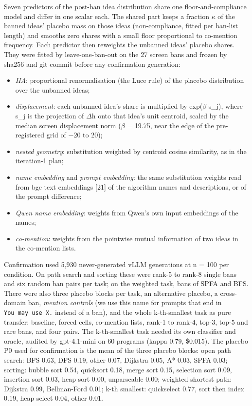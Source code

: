 \documentclass[11pt,letterpaper]{article}
\begin{document}
Seven predictors of the post-ban idea distribution share one floor-and-compliance model and differ in one scalar each. The shared part keeps a fraction \ensuremath{\kappa} of the banned ideas' placebo mass on those ideas (non-compliance, fitted per ban-list length) and smooths zero shares with a small floor proportional to co-mention frequency. Each predictor then reweights the unbanned ideas' placebo shares. They were fitted by leave-one-ban-out on the 27 screen bans and frozen by sha256 and git commit before any confirmation generation:

\begin{itemize}
\item \emph{IIA}: proportional renormalisation (the Luce rule) of the placebo distribution over the unbanned ideas;
\item \emph{displacement}: each unbanned idea's share is multiplied by exp(\ensuremath{\beta} s\_j), where s\_j is the projection of \ensuremath{\Delta}h onto that idea's unit centroid, scaled by the median screen displacement norm (\ensuremath{\beta} = 19.75, near the edge of the pre-registered grid of \ensuremath{-}20 to 20);
\item \emph{nested geometry}: substitution weighted by centroid cosine similarity, as in the iteration-1 plan;
\item \emph{name embedding} and \emph{prompt embedding}: the same substitution weights read from bge text embeddings [21] of the algorithm names and descriptions, or of the prompt difference;
\item \emph{Qwen name embedding}: weights from Qwen's own input embeddings of the names;
\item \emph{co-mention}: weights from the pointwise mutual information of two ideas in the co-mention lists.
\end{itemize}
Confirmation used 5,930 never-generated vLLM generations at n = 100 per condition. On path search and sorting these were rank-5 to rank-8 single bans and six random ban pairs per task; on the weighted task, bans of SPFA and BFS. There were also three placebo blocks per task, an alternative placebo, a cross-domain ban, \emph{mention controls} (we use this name for prompts that end in \texttt{You\ may\ use\ X.} instead of a ban), and the whole k-th-smallest task as pure transfer: baseline, forced cells, co-mention lists, rank-1 to rank-4, top-3, top-5 and rare bans, and four pairs. The k-th-smallest task needed its own classifier and oracle, audited by gpt-4.1-mini on 60 programs (kappa 0.79, \$0.015). The placebo P0 used for confirmation is the mean of the three placebo blocks: open path search: BFS 0.63, DFS 0.19, other 0.07, Dijkstra 0.05, A* 0.03, SPFA 0.03; sorting: bubble sort 0.54, quicksort 0.18, merge sort 0.15, selection sort 0.09, insertion sort 0.03, heap sort 0.00, unparseable 0.00; weighted shortest path: Dijkstra 0.99, Bellman-Ford 0.01; k-th smallest: quickselect 0.77, sort then index 0.19, heap select 0.04, other 0.01.
\end{document}
